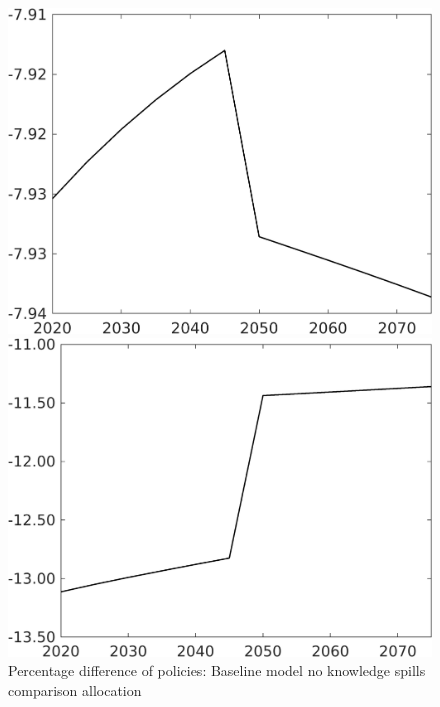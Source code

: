 \documentclass[12pt]{article}
\begin{document}
\begin{figure}[h!!]
	\centering
	\caption{Percentage difference of policies: Baseline model no knowledge spills comparison allocation}\label{fig:Pertauf_nsk0_xgr0_noknow2}
	
	\begin{minipage}[]{0.32\textwidth}
		\includegraphics[width=1\textwidth]{../../codding_model/own_basedOnFried/optimalPol_010922_revision/figures/all_13Sept22/CompTaufPER_bytaul_Reg0_N_spillover0_nsk0_xgr0_knspil1_sep0_LFlimit1_emsbase0_countec0_GovRev0_etaa0.79_lgd0.png}
	\end{minipage}	
	\begin{minipage}[]{0.32\textwidth}
		\includegraphics[width=1\textwidth]{../../codding_model/own_basedOnFried/optimalPol_010922_revision/figures/all_13Sept22/CompTaufPER_bytaul_Reg0_G_spillover0_nsk0_xgr0_knspil1_sep0_LFlimit1_emsbase0_countec0_GovRev0_etaa0.79_lgd0.png}

\end{minipage}
\end{figure}
\end{document}

